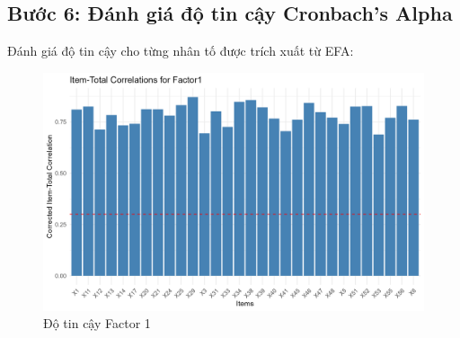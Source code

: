 \subsection{Bước 6: Đánh giá độ tin cậy Cronbach's Alpha}

Đánh giá độ tin cậy cho từng nhân tố được trích xuất từ EFA:

\begin{figure}[h!]
        \centering
        \includegraphics[width=0.55\linewidth]{../../assets/images/reliability_Factor1.png}
        \caption{Độ tin cậy Factor 1}
        \label{fig:h2}
\end{figure}

